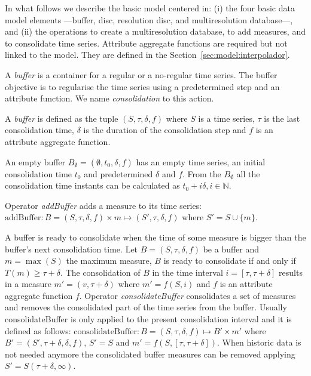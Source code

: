 In what follows we describe the basic  model centered in:
(i) the four basic data model elements ---buffer, disc, resolution
disc, and multiresolution database---, and (ii) the operations to
create a multiresolution database, to add measures, and to consolidate
time series. Attribute aggregate functions are required but not linked
to the model. They are defined in the
Section~\ref{sec:model:interpolador}.

A \emph{buffer} is a container for a regular or a no-regular time
series. The buffer objective is to regularise the time series using a
predetermined step and an attribute function. We name
\emph{consolidation} to this action.
\begin{definition}[Buffer]
  A \emph{buffer} is defined as the tuple $(S,\tau,\delta,f)$ where
  $S$ is a time series, $\tau$ is the last consolidation time,
  $\delta$ is the duration of the consolidation step and $f$ is an
  attribute aggregate function.

  An empty buffer $B_{\emptyset} = (\emptyset,t_0, \delta, f)$ has an
  empty time series, an initial consolidation time $t_0$ and
  predetermined $\delta$ and $f$. From the $B_{\emptyset}$ all the
  consolidation time instants can be calculated as $t_0+i\delta,
  i\in\mathbb{N}$.
\end{definition}

Operator \emph{addBuffer} adds a measure to its time series:
$\text{addBuffer}: B = (S,\tau,\delta,f) \times m \mapsto
(S',\tau,\delta,f)$ where $S' = S \cup \{m\} $.

A buffer is ready to consolidate when the time of some measure is
bigger than the buffer's next consolidation time.  Let
$B=(S,\tau,\delta,f)$ be a buffer and $m=\max(S)$ the maximum measure,
$B$ is ready to consolidate if and only if $T(m) \geq \tau+\delta$.
The consolidation of $B$ in the time interval $i=[\tau,\tau+\delta]$
results in a measure $m'=(v,\tau+\delta)$ where $m'=f(S,i)$ and $f$ is
an attribute aggregate function $f$. Operator \emph{consolidateBuffer}
consolidates a set of measures and removes the consolidated part of
the time series from the buffer. Usually consolidateBuffer is only
applied to the present consolidation interval and it is defined as
follows: $\text{consolidateBuffer}: B=(S,\tau,\delta,f) \mapsto B'
\times m' $ where $ B'= (S',\tau+\delta,\delta,f)$, $S' = S$ and $m' =
f(S,[\tau,\tau+\delta])$. When historic data is not needed anymore the
consolidated buffer measures can be removed applying $S' =
S(\tau+\delta,\infty)$.

